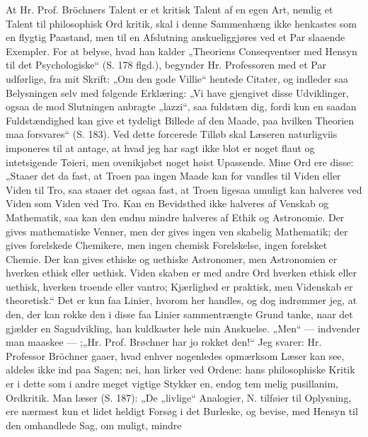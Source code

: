 \documentclass[12pt]{book}
\newcommand{\opage}[1]{\marginnote{\footnotesize\textit{[#1]}}}
\begin{document}
At Hr. Prof. Bröchners Talent er et kritisk Talent
af en egen Art, nemlig et Talent til philosophisk Ord\-%
kritik, skal i denne Sammenhæng ikke henkastes som en
flygtig Paastand, men til en Afslutning anskueliggjøres
ved et Par slaaende Exempler. For at belyse, hvad han
kalder „Theoriens Conseqventser med Hensyn til det
Psychologiske“ (S. 178 flgd.), begynder Hr. Professoren
med et Par udførlige, fra mit Skrift: „Om den gode Villie“
hentede Citater, og indleder saa Belysningen selv med
\opage{49}\setcounter{footnote}{0}%
følgende Erklæring: „Vi have gjengivet disse Udviklinger,
ogsaa de mod Slutningen anbragte „lazzi“, saa fuldstæn\-%
dig, fordi kun en saadan Fuldstændighed kan give et
tydeligt Billede af den Maade, paa hvilken Theorien
maa forsvares“ (S. 183). Ved dette forcerede Tilløb skal
Læseren naturligviis imponeres til at antage, at hvad jeg
har sagt ikke blot er noget flaut og intetsigende Tøieri, men
ovenikjøbet noget høist Upassende. Mine Ord ere disse:
„Staaer det da fast, at Troen paa ingen Maade kan for\-%
vandles til Viden eller Viden til Tro, saa staaer det
ogsaa fast, at Troen ligesaa umuligt kan halveres ved
Viden som Viden ved Tro. Kan en Bevidsthed ikke
halveres af Venskab og Mathematik, saa kan den
endnu mindre halveres af Ethik og Astronomie. Der
gives mathematiske Venner, men der gives ingen ven\-%
skabelig Mathematik; der gives forelskede Chemikere,
men ingen chemisk Forelskelse, ingen forelsket Chemie.
Der kan gives ethiske og uethiske Astronomer, men
Astronomien er hverken ethisk eller uethisk. Viden\-%
skaben er med andre Ord hverken ethisk eller uethisk,
hverken troende eller vantro; Kjærlighed er praktisk,
men Videnskab er theoretisk.“ Det er kun faa Linier,
hvorom her handles, og dog indrømmer jeg, at den, der
kan rokke den i disse faa Linier sammentrængte Grund\-%
tanke, naar det gjælder en Sagudvikling, han kuldkaster
hele min Anskuelse. „Men“ --- indvender man maaskee
--- ;„Hr. Prof. Brøchner har jo rokket den!“ Jeg svarer: %
Hr. Professor Bröchner gaaer, hvad enhver nogenledes
opmærksom Læser kan see, aldeles ikke ind paa Sagen;
nei, han lirker ved Ordene: hans philosophiske Kritik er
i dette som i andre meget vigtige Stykker en, endog tem\-%
melig pusillanim, Ordkritik. Man læser (S. 187): „De
„livlige“ Analogier, N. tilføier til Oplysning, ere nærmest
kun et lidet heldigt Forsøg i det Burleske, og bevise,
\opage{50}\setcounter{footnote}{0}%
med Hensyn til den omhandlede Sag, om muligt, mindre
\end{document}
